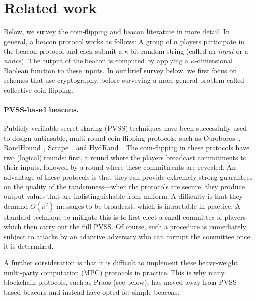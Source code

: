 \section{Related work}\label{sec:praos-related-work}


Below, we survey the coin-flipping and beacon literature in more detail. 
In general, a beacon protocol works as follows: 
A group of $n$ players participate in the beacon protocol 
and each submit a $\kappa$-bit random string (called an \emph{input} or a \emph{nonce}). 
The output of the beacon is computed by applying 
a $\kappa$-dimensional Boolean function to these inputs. 
In our brief survey below, we first focus on schemes that use cryptography, 
before surveying a more general problem called collective coin-flipping.



\paragraph{PVSS-based beacons.} 
Publicly verifiable secret sharing (PVSS) techniques have been
successfully used to design unbiasable, multi-round coin-flipping
protocols, such as Ouroboros~\cite{Ouroboros},
RandHound~\cite{RandHound}, Scrape~\cite{Scrape}, and
HydRand~\cite{HydRand}.  The coin-flipping in these protocols have two
(logical) rounds: first, a round where the players broadcast
commitments to their inputs, followed by a round where these
commitments are revealed. An advantage of these protocols is that they
can provide extremely strong guarantees on the quality of the
randomness---when the protocols are secure, they produce output values
that are indistinguishable from uniform. A difficulty is that they
demand $O(n^2)$ messages to be broadcast, which is intractable in
practice. A standard technique to mitigate this is to first elect a small
committee of players which then carry out the full PVSS. Of course,
such a procedure is immediately subject to attacks by an adaptive
adversary who can corrupt the committee once it is determined.

A further consideration is that it is difficult to implement 
these heavy-weight multi-party computation (MPC) protocols in practice. 
This is why many blockchain protocols, 
such as Praos (see below), 
has moved away from PVSS-based beacons and instead 
have opted for simple beacons.



